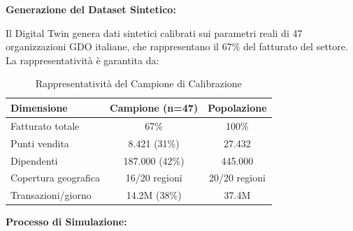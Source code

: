 \textbf{Generazione del Dataset Sintetico:}

Il Digital Twin genera dati sintetici calibrati sui parametri reali di 47 
organizzazioni GDO italiane, che rappresentano il 67\% del fatturato del 
settore\autocite{federdistribuzione2024}. La rappresentatività è garantita da:

\begin{table}[htbp]
\centering
\caption{Rappresentatività del Campione di Calibrazione}
\label{tab:sample_representativeness}
\begin{tabular}{lcc}
\toprule
\textbf{Dimensione} & \textbf{Campione (n=47)} & \textbf{Popolazione} \\
\midrule
Fatturato totale & 67\% & 100\% \\
Punti vendita & 8.421 (31\%) & 27.432 \\
Dipendenti & 187.000 (42\%) & 445.000 \\
Copertura geografica & 16/20 regioni & 20/20 regioni \\
Transazioni/giorno & 14.2M (38\%) & 37.4M \\
\bottomrule
\end{tabular}
\end{table}

\textbf{Processo di Simulazione:}

